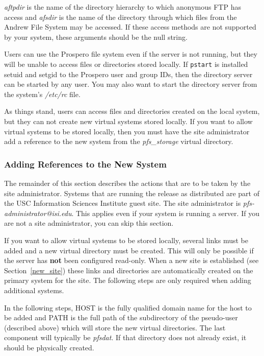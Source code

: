 {\em aftpdir} is the name of the directory hierarchy to which
anonymous FTP has access and {\em afsdir} is the name of the directory
through which files from the Andrew File System may be accessed.  If
these access methods are not supported by your system, these arguments
should be the null string.

Users can use the Prospero file system even if the server is not
running, but they will be unable to access files or directories stored
locally.  If {\tt pstart} is installed setuid and setgid to the
Prospero user and group IDs, then the directory server can be started
by any user.  You may also want to start the directory server from the
system's {\it /etc/rc} file.

As things stand, users can access files and directories created on the
local system, but they can not create new virtual systems stored
locally.  If you want to allow virtual systems to be stored locally,
then you must have the site administrator add a reference to the new
system from the {\it pfs\_storage} virtual directory.

\subsubsection*{Adding References to the New System}

The remainder of this section describes the actions that are to be
taken by the site administrator.  Systems that are running the release
as distributed are part of the USC Information Sciences Institute
guest site.  The site administrator is {\it
pfs-administrator@isi.edu}.  This applies even if your system is
running a server.  If you are not a site administrator, you can skip
this section.

If you want to allow virtual systems to be stored locally, several
links must be added and a new virtual directory must be created.  This
will only be possible if the server has {\bf not} been configured read-only.
When a new site is established (see Section~\ref{new_site}) these
links and directories are automatically created on the primary system
for the site.  The following steps are only required when adding
additional systems.

In the following steps, HOST is the fully qualified domain name for
the host to be added and PATH is the full path of the subdirectory of
the pseudo-user (described above) which will store the new virtual
directories.  The last component will typically be {\it pfsdat}.  If
that directory does not already exist, it should be physically created.

